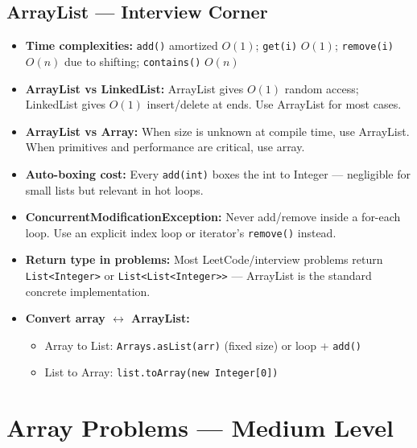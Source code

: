 \documentclass[12pt,a4paper,oneside]{book}
\begin{document}
\section{ArrayList --- Interview Corner}

\begin{interviewcorner}
\begin{itemize}
  \item \textbf{Time complexities:} \texttt{add()} amortized $O(1)$; \texttt{get(i)} $O(1)$; \texttt{remove(i)} $O(n)$ due to shifting; \texttt{contains()} $O(n)$
  \item \textbf{ArrayList vs LinkedList:} ArrayList gives $O(1)$ random access; LinkedList gives $O(1)$ insert/delete at ends. Use ArrayList for most cases.
  \item \textbf{ArrayList vs Array:} When size is unknown at compile time, use ArrayList. When primitives and performance are critical, use array.
  \item \textbf{Auto-boxing cost:} Every \texttt{add(int)} boxes the int to Integer --- negligible for small lists but relevant in hot loops.
  \item \textbf{ConcurrentModificationException:} Never add/remove inside a for-each loop. Use an explicit index loop or iterator's \texttt{remove()} instead.
  \item \textbf{Return type in problems:} Most LeetCode/interview problems return \texttt{List<Integer>} or \texttt{List<List<Integer>>} --- ArrayList is the standard concrete implementation.
  \item \textbf{Convert array $\leftrightarrow$ ArrayList:}
    \begin{itemize}
      \item Array to List: \texttt{Arrays.asList(arr)} (fixed size) or loop + \texttt{add()}
      \item List to Array: \texttt{list.toArray(new Integer[0])}
    \end{itemize}
\end{itemize}
\end{interviewcorner}

\chapter{Array Problems --- Medium Level}
\end{document}
